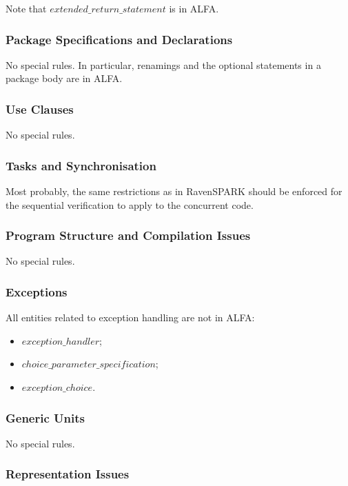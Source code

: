 \documentclass{article}
\newcommand{\bnf}[1]{$\mathit{#1}$}
\begin{document}
Note that \bnf{extended\_return\_statement} is in ALFA.

\subsubsection{Package Specifications and Declarations}

No special rules. In particular, renamings and the optional statements in a
package body are in ALFA.

\subsubsection{Use Clauses}

No special rules.

\subsubsection{Tasks and Synchronisation}

Most probably, the same restrictions as in RavenSPARK should be enforced for
the sequential verification to apply to the concurrent code.

\subsubsection{Program Structure and Compilation Issues}

No special rules.

\subsubsection{Exceptions}

All entities related to exception handling are not in ALFA:
\begin{itemize}
\item \bnf{exception\_handler};
\item \bnf{choice\_parameter\_specification};
\item \bnf{exception\_choice}.
\end{itemize}

\subsubsection{Generic Units}

No special rules.

\subsubsection{Representation Issues}
\end{document}
